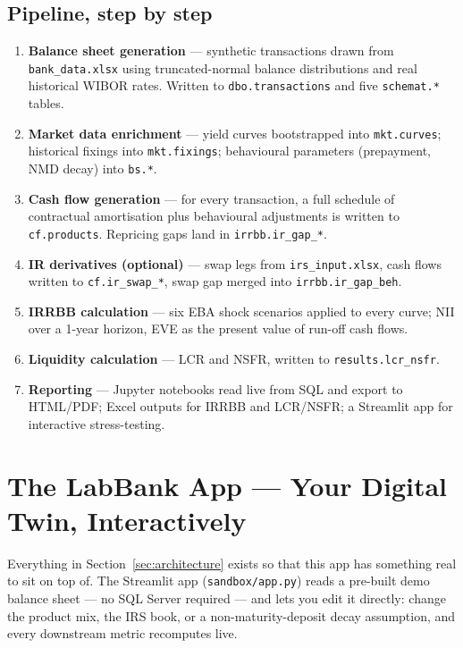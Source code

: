 \documentclass[11pt,a4paper]{article}
\begin{document}
\subsection{Pipeline, step by step}
\begin{enumerate}[itemsep=2pt]
  \item \textbf{Balance sheet generation} --- synthetic transactions drawn from
        \texttt{bank\_data.xlsx} using truncated-normal balance distributions
        and real historical WIBOR rates. Written to \texttt{dbo.transactions}
        and five \texttt{schemat.*} tables.
  \item \textbf{Market data enrichment} --- yield curves bootstrapped into
        \texttt{mkt.curves}; historical fixings into \texttt{mkt.fixings};
        behavioural parameters (prepayment, NMD decay) into \texttt{bs.*}.
  \item \textbf{Cash flow generation} --- for every transaction, a full schedule
        of contractual amortisation plus behavioural adjustments is written to
        \texttt{cf.products}. Repricing gaps land in \texttt{irrbb.ir\_gap\_*}.
  \item \textbf{IR derivatives (optional)} --- swap legs from
        \texttt{irs\_input.xlsx}, cash flows written to \texttt{cf.ir\_swap\_*},
        swap gap merged into \texttt{irrbb.ir\_gap\_beh}.
  \item \textbf{IRRBB calculation} --- six EBA shock scenarios applied to every
        curve; NII over a 1-year horizon, EVE as the present value of run-off
        cash flows.
  \item \textbf{Liquidity calculation} --- LCR and NSFR, written to
        \texttt{results.lcr\_nsfr}.
  \item \textbf{Reporting} --- Jupyter notebooks read live from SQL and export
        to HTML/PDF; Excel outputs for IRRBB and LCR/NSFR; a Streamlit app for
        interactive stress-testing.
\end{enumerate}

\section{The LabBank App --- Your Digital Twin, Interactively}
\label{sec:labbankapp}

Everything in Section~\ref{sec:architecture} exists so that this app has
something real to sit on top of. The Streamlit app (\texttt{sandbox/app.py}) reads a pre-built demo
balance sheet --- no SQL Server required --- and lets you edit it directly:
change the product mix, the IRS book, or a non-maturity-deposit decay
assumption, and every downstream metric recomputes live.
\end{document}

